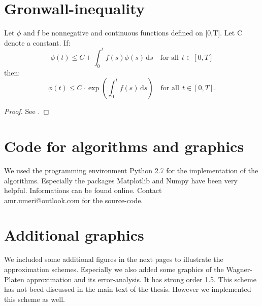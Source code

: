 



\chapter{Gronwall-inequality}
\label{Gronwall}
Let \(\phi\) and f be nonnegative and continuous functions defined on [0,T]. Let C denote a constant. If:
\[\phi(t)\leq C + \int_0^t \! f(s)\phi(s)\,\mathrm{d}s\quad\text{for all}\:\:t\in[0,T]\]
then:
\[\phi(t)\leq C\cdot\exp(\int_0^t \! f(s)\,\mathrm{d}s) \quad\text{for all}\:\:t\in[0,T].\]
\begin{proof}
See \cite{EvansSDE}.
\end{proof}

\chapter{Code for algorithms and graphics}
\label{code}
We used the programming environment Python 2.7 for the implementation of the algorithms. Especially the packages Matplotlib and Numpy have been very helpful. Informations can be found online. Contact\\
amr.umeri@outlook.com for the source-code.












\chapter{Additional graphics}
\label{Graphics}
We included some additional figures in the next pages to illustrate the approximation schemes. Especially we also added some graphics of the Wagner-Platen approximation and its error-analysis. It has strong order 1.5. This scheme has not beed discussed in the main text of the thesis. However we implemented this scheme as well.


